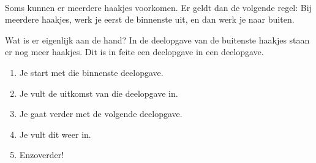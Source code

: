 %
%
\ 

\begin{ftonthoud}
	Soms kunnen er meerdere haakjes voorkomen. Er geldt dan de volgende regel: Bij meerdere haakjes, werk je eerst de binnenste uit, en dan werk je naar buiten. 
	
	
	Wat is er eigenlijk aan de hand? In de deelopgave van de buitenste haakjes staan er nog meer haakjes. Dit is in feite een deelopgave in een deelopgave.
	
	\begin{enumerate}
		\item Je start met die binnenste deelopgave.
		\item Je vult de uitkomst van die deelopgave in.
		\item Je gaat verder met de volgende deelopgave.
		\item Je vult dit weer in.
		\item Enzoverder!
	\end{enumerate}
\end{ftonthoud}

